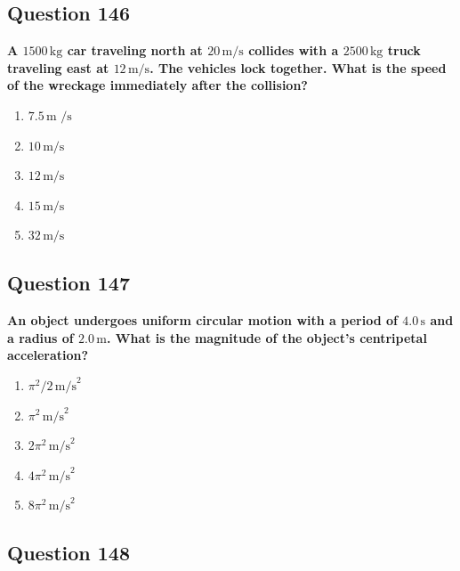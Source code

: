 \documentclass[12pt,letterpaper]{article}
\begin{document}
\subsection{Question 146}

\begin{questionbox}
\textbf{A $1500\,\text{kg}$ car traveling north at $20\,\text{m/s}$ collides with a $2500\,\text{kg}$ truck traveling east at $12\,\text{m/s}$. The vehicles lock together. What is the speed of the wreckage immediately after the collision?}

\begin{enumerate}[label=\alph*)]
    \item $7.5\,\text{m
/s}$
    \item $10\,\text{m/s}$
    \item $12\,\text{m/s}$
    \item $15\,\text{m/s}$
    \item $32\,\text{m/s}$
\end{enumerate}
\end{questionbox}

\subsection{Question 147}

\begin{questionbox}
\textbf{An object undergoes uniform circular motion with a period of $4.0\,\text{s}$ and a radius of $2.0\,\text{m}$. What is the magnitude of the object's centripetal acceleration?}

\begin{enumerate}[label=\alph*)]
    \item $\pi^2/2\,\text{m/s}^2$
    \item $\pi^2\,\text{m/s}^2$
    \item $2\pi^2\,\text{m/s}^2$
    \item $4\pi^2\,\text{m/s}^2$
    \item $8\pi^2\,\text{m/s}^2$
\end{enumerate}
\end{questionbox}

\subsection{Question 148}
\end{document}
